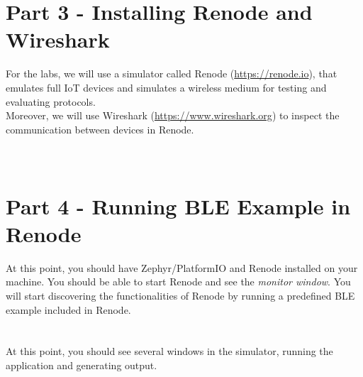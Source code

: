 \documentclass[11pt]{article}
\begin{document}
\section*{Part 3 - Installing Renode and Wireshark}

For the labs, we will use a simulator called Renode (\url{https://renode.io}), that emulates full IoT devices and simulates a wireless medium for testing and evaluating protocols.\\
Moreover, we will use Wireshark (\url{https://www.wireshark.org}) to inspect the communication between devices in Renode.\\
\\
\noindent{}\\



\section*{Part 4 - Running BLE Example in Renode}

At this point, you should have Zephyr/PlatformIO and Renode installed on your machine.
You should be able to start Renode and see the \textit{monitor window}.
You will start discovering the functionalities of Renode by running a predefined BLE example included in Renode.
\\
\\
\noindent{}\\

At this point, you should see several windows in the simulator, running the application and generating output.
\\
\\
\noindent{}\\
\end{document}
